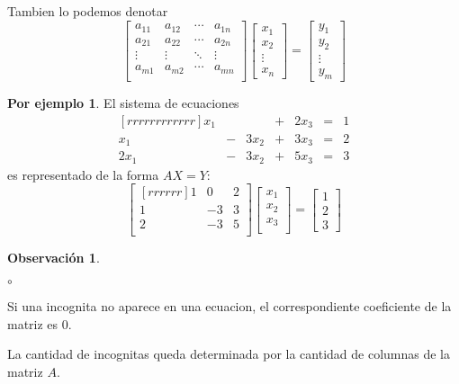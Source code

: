 \documentclass{article}
\theoremstyle{definition}
\theoremstyle{definition}
\newtheorem*{obs}{Observación}
\newtheorem*{ej}{Por ejemplo}
\theoremstyle{remark}
\begin{document}
Tambien lo podemos denotar \[
\begin{bmatrix}
  a_{11} &   a_{12}    & \cdots & a_{1n}   \\ 
  a_{21} &   a_{22}   & \cdots & a_{2n}   \\ 
\vdots & \vdots & \ddots & \vdots  \\
  a_{m1} &   a_{m2}    & \cdots & a_{mn}   \\ 
\end{bmatrix}
\begin{bmatrix}
x_1 \\
x_2 \\
 \vdots \\
 x_n
\end{bmatrix}
=
\begin{bmatrix}
  y_1\\
  y_2\\
  \vdots \\
  y_m
\end{bmatrix}
\]\begin{ej}
El sistema de ecuaciones \[
 \begin{matrix}[rrrrrrrrrrrr]
     x_1 &  & & + & 2x_3 & = & 1 \\
     x_1 & - &3x_2 & + & 3x_3 & = & 2 \\
     2x_1& - & 3x_2 & + & 5x_3 & = & 3
  \end{matrix}
\] es representado de la forma $AX=Y$:
\[
\begin{bmatrix}[rrrrrr]
  1 & 0 & 2 \\
  1 & -3 & 3 \\
  2 & -3 & 5 \\
\end{bmatrix}
\begin{bmatrix}
x_1 \\
x_2 \\
x_3 \\
\end{bmatrix}
=
\begin{bmatrix}
  1\\
  2\\
  3
\end{bmatrix}
\]
\end{ej}
\begin{obs}
  
\end{obs}
\begin{list}{$\circ$}{}  
\item Si una incognita no aparece en una ecuacion, el correspondiente coeficiente de la matriz es $0$. 
\item La cantidad de incognitas queda determinada por la cantidad de columnas de la matriz $A$.
\end{list}
\end{document}
